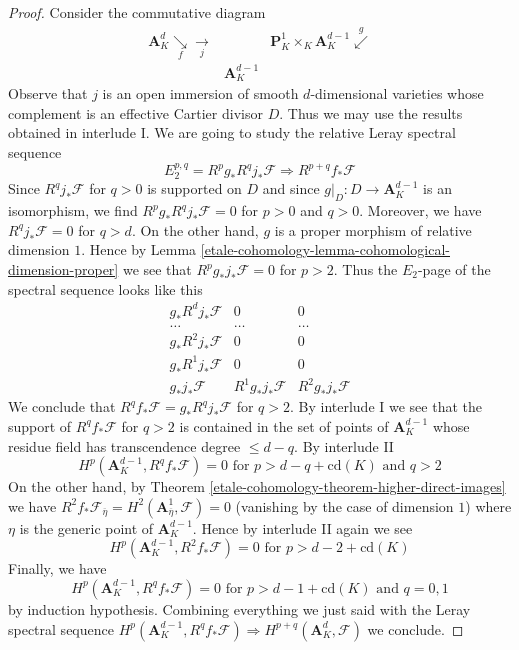 \begin{proof}
\medskip\noindent
Consider the commutative diagram
$$
\begin{array}{ccc}\mathbf{A}^d_K \underset{f}{\searrow}\underset{j}{\longrightarrow} &  & \mathbf{P}^1_K \times_K \mathbf{A}^{d - 1}_K \overset{g}{\swarrow} \\  & \mathbf{A}^{d - 1}_K & \end{array}
$$
Observe that $j$ is an open immersion of smooth $d$-dimensional
varieties whose complement is an effective Cartier divisor $D$. Thus
we may use the results obtained in interlude I.
We are going to study the relative Leray spectral sequence
$$
E_2^{p, q} = R^pg_*R^qj_*\mathcal{F} \Rightarrow R^{p + q}f_*\mathcal{F}
$$
Since $R^qj_*\mathcal{F}$ for $q > 0$ is supported on $D$ and since
$g|_D : D \to \mathbf{A}^{d - 1}_K$ is an isomorphism, we find
$R^pg_*R^qj_*\mathcal{F} = 0$ for $p > 0$ and $q > 0$. Moreover, we have
$R^qj_*\mathcal{F} = 0$ for $q > d$. On the other hand, $g$ is a
proper morphism of relative dimension $1$. Hence by
Lemma \ref{etale-cohomology-lemma-cohomological-dimension-proper}
we see that $R^pg_*j_*\mathcal{F} = 0$ for $p > 2$. Thus the $E_2$-page
of the spectral sequence looks like this
$$
\begin{matrix}
g_*R^dj_*\mathcal{F} & 0 & 0 \\
\ldots & \ldots & \ldots \\
g_*R^2j_*\mathcal{F} & 0 & 0 \\
g_*R^1j_*\mathcal{F} & 0 & 0 \\
g_*j_*\mathcal{F} & R^1g_*j_*\mathcal{F} & R^2g_*j_*\mathcal{F}
\end{matrix}
$$
We conclude that $R^qf_*\mathcal{F} = g_*R^qj_*\mathcal{F}$ for $q > 2$.
By interlude I we see that the support of $R^qf_*\mathcal{F}$ for $q > 2$
is contained in the set of points of $\mathbf{A}^{d - 1}_K$
whose residue field has transcendence degree $\leq d - q$.
By interlude II
$$
H^p(\mathbf{A}^{d - 1}_K, R^qf_*\mathcal{F}) = 0
\text{ for }p > d - q + \text{cd}(K)\text{ and }q > 2
$$
On the other hand, by Theorem \ref{etale-cohomology-theorem-higher-direct-images}
we have $R^2f_*\mathcal{F}_{\overline{\eta}} =
H^2(\mathbf{A}^1_{\overline{\eta}}, \mathcal{F}) = 0$
(vanishing by the case of dimension $1$) where $\eta$ is the
generic point of $\mathbf{A}^{d - 1}_K$.
Hence by interlude II again we see
$$
H^p(\mathbf{A}^{d - 1}_K, R^2f_*\mathcal{F}) = 0
\text{ for }p > d - 2 + \text{cd}(K)
$$
Finally, we have
$$
H^p(\mathbf{A}^{d - 1}_K, R^qf_*\mathcal{F}) = 0
\text{ for }p > d - 1 + \text{cd}(K)\text{ and }q = 0, 1
$$
by induction hypothesis. Combining everything we just said
with the Leray spectral sequence
$H^p(\mathbf{A}^{d - 1}_K, R^qf_*\mathcal{F}) \Rightarrow
H^{p + q}(\mathbf{A}^d_K, \mathcal{F})$ we conclude.
\end{proof}

